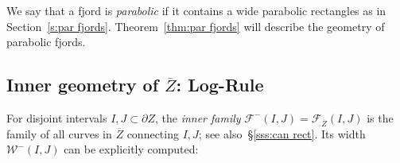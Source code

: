 \documentclass{amsart}
\newcommand{\1}{{\mathbb 1 }}
\newcommand{\Fam}{{\mathcal F}}
\newcommand{\Width}{{\mathcal W}}
\newcommand{\ovZ}{{\overline Z}}
\theoremstyle{remark}
\numberwithin{equation}{section}
\theoremstyle{definition}
\begin{document}
We say that a fjord is \emph{parabolic} if it contains a wide parabolic rectangles as in Section~\ref{s:par fjords}. Theorem~\ref{thm:par fjords} will describe the geometry of parabolic fjords.










\subsection{Inner geometry of $\overline Z$: Log-Rule}
\label{ss:GeomZ}
 For disjoint intervals $I,J\subset\partial Z$,  the \emph{inner family} $\Fam^-(I,J)=\Fam_{\ovZ}(I,J)$ is the family of all curves in $\ovZ$ connecting $I,J$; see also~\S\ref{sss:can rect}. Its width $\Width^-(I,J)$ can be explicitly computed:
\end{document}
